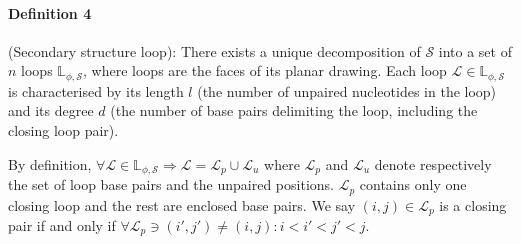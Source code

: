 \paragraph{\textbf{Definition 4} }(Secondary structure loop):  
There exists a unique decomposition of $\mathcal{S}$ into a set of $n$ loops $\mathbb{L}_{\phi, \mathcal{S}}$, where loops are the faces of its planar drawing. Each loop $\mathcal{L} \in \mathbb{L}_{\phi, \mathcal{S}}$ is characterised by its length $l$ (the number of unpaired nucleotides in the loop) and its degree $d$ (the number of base pairs delimiting the loop, including the closing loop pair). 

By definition, $\forall  \mathcal{L} \in \mathbb{L}_{\phi, \mathcal{S}} \Rightarrow \mathcal{L}  = \mathcal{L}_p \cup \mathcal{L}_u$ where $\mathcal{L}_p$ and $\mathcal{L}_u$ denote respectively the set of loop base pairs and the unpaired positions. $\mathcal{L}_p$ contains only one closing loop and the rest are enclosed base pairs. We say $(i,j) \in \mathcal{L}_p$ is a closing pair if and only if $\forall \mathcal{L}_p \ni (i',j') \neq (i,j) \colon i<i'<j'<j$.



